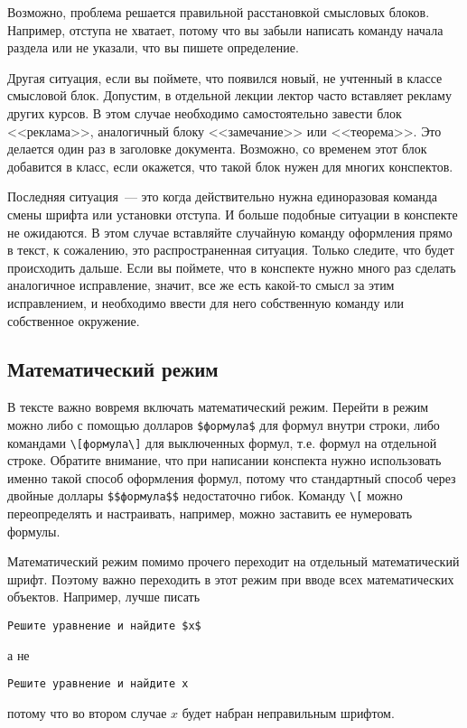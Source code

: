 \documentclass{article}
\begin{document}
    Возможно, проблема решается правильной расстановкой смысловых блоков. Например, отступа
    не хватает, потому что вы забыли написать команду начала раздела или не указали, что
    вы пишете определение.

    Другая ситуация, если вы поймете, что появился новый, не учтенный в классе смысловой блок.
    Допустим, в отдельной лекции лектор часто вставляет рекламу других курсов. В этом случае
    необходимо самостоятельно завести блок <<реклама>>, аналогичный блоку <<замечание>>
    или <<теорема>>. Это делается один раз в заголовке документа. Возможно, со временем
    этот блок добавится в класс, если окажется, что такой блок нужен для многих конспектов.

    Последняя ситуация~--- это когда действительно нужна единоразовая команда смены шрифта
    или установки отступа. И больше подобные ситуации в конспекте не ожидаются. В этом случае
    вставляйте случайную команду оформления прямо в текст, к сожалению, это
    распространенная ситуация. Только следите, что будет происходить дальше. Если вы поймете, что
    в конспекте нужно много раз сделать аналогичное исправление, значит, все же
    есть какой-то смысл за этим исправлением, и необходимо ввести для него
    собственную команду или собственное окружение.

    \subsection{Математический режим}
    В тексте важно вовремя включать математический режим. Перейти в режим можно либо с помощью долларов \verb|$формула$| для формул внутри строки, либо командами \verb|\[формула\]| для выключенных формул, т.е. формул на отдельной строке.
    Обратите внимание, что при написании конспекта нужно использовать именно такой способ оформления формул, потому что стандартный способ через двойные доллары \verb|$$формула$$| недостаточно гибок.
    Команду \verb|\[| можно переопределять и настраивать, например, можно заставить ее нумеровать формулы.

    Математический режим помимо прочего переходит на отдельный математический шрифт.
    Поэтому важно переходить в этот режим при вводе всех математических объектов.
    Например, лучше писать \begin{verbatim}Решите уравнение и найдите $x$
    \end{verbatim} а не \begin{verbatim}Решите уравнение и найдите x
    \end{verbatim} потому что во втором случае $x$ будет набран неправильным шрифтом.
\end{document}
